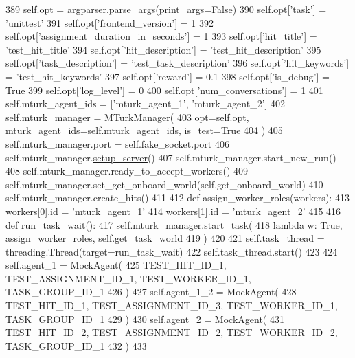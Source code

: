 \begin{DoxyCode}
389         self.opt = argparser.parse\_args(print\_args=\textcolor{keyword}{False})
390         self.opt[\textcolor{stringliteral}{'task'}] = \textcolor{stringliteral}{'unittest'}
391         self.opt[\textcolor{stringliteral}{'frontend\_version'}] = 1
392         self.opt[\textcolor{stringliteral}{'assignment\_duration\_in\_seconds'}] = 1
393         self.opt[\textcolor{stringliteral}{'hit\_title'}] = \textcolor{stringliteral}{'test\_hit\_title'}
394         self.opt[\textcolor{stringliteral}{'hit\_description'}] = \textcolor{stringliteral}{'test\_hit\_description'}
395         self.opt[\textcolor{stringliteral}{'task\_description'}] = \textcolor{stringliteral}{'test\_task\_description'}
396         self.opt[\textcolor{stringliteral}{'hit\_keywords'}] = \textcolor{stringliteral}{'test\_hit\_keywords'}
397         self.opt[\textcolor{stringliteral}{'reward'}] = 0.1
398         self.opt[\textcolor{stringliteral}{'is\_debug'}] = \textcolor{keyword}{True}
399         self.opt[\textcolor{stringliteral}{'log\_level'}] = 0
400         self.opt[\textcolor{stringliteral}{'num\_conversations'}] = 1
401         self.mturk\_agent\_ids = [\textcolor{stringliteral}{'mturk\_agent\_1'}, \textcolor{stringliteral}{'mturk\_agent\_2'}]
402         self.mturk\_manager = MTurkManager(
403             opt=self.opt, mturk\_agent\_ids=self.mturk\_agent\_ids, is\_test=\textcolor{keyword}{True}
404         )
405         self.mturk\_manager.port = self.fake\_socket.port
406         self.mturk\_manager.\hyperlink{namespaceparlai_1_1chat__service_1_1services_1_1messenger_1_1server__utils_afb56b04206cd0f42384438f1ac6d9cda}{setup\_server}()
407         self.mturk\_manager.start\_new\_run()
408         self.mturk\_manager.ready\_to\_accept\_workers()
409         self.mturk\_manager.set\_get\_onboard\_world(self.get\_onboard\_world)
410         self.mturk\_manager.create\_hits()
411 
412         \textcolor{keyword}{def }assign\_worker\_roles(workers):
413             workers[0].id = \textcolor{stringliteral}{'mturk\_agent\_1'}
414             workers[1].id = \textcolor{stringliteral}{'mturk\_agent\_2'}
415 
416         \textcolor{keyword}{def }run\_task\_wait():
417             self.mturk\_manager.start\_task(
418                 \textcolor{keyword}{lambda} w: \textcolor{keyword}{True}, assign\_worker\_roles, self.get\_task\_world
419             )
420 
421         self.task\_thread = threading.Thread(target=run\_task\_wait)
422         self.task\_thread.start()
423 
424         self.agent\_1 = MockAgent(
425             TEST\_HIT\_ID\_1, TEST\_ASSIGNMENT\_ID\_1, TEST\_WORKER\_ID\_1, TASK\_GROUP\_ID\_1
426         )
427         self.agent\_1\_2 = MockAgent(
428             TEST\_HIT\_ID\_1, TEST\_ASSIGNMENT\_ID\_3, TEST\_WORKER\_ID\_1, TASK\_GROUP\_ID\_1
429         )
430         self.agent\_2 = MockAgent(
431             TEST\_HIT\_ID\_2, TEST\_ASSIGNMENT\_ID\_2, TEST\_WORKER\_ID\_2, TASK\_GROUP\_ID\_1
432         )
433 
\end{DoxyCode}
